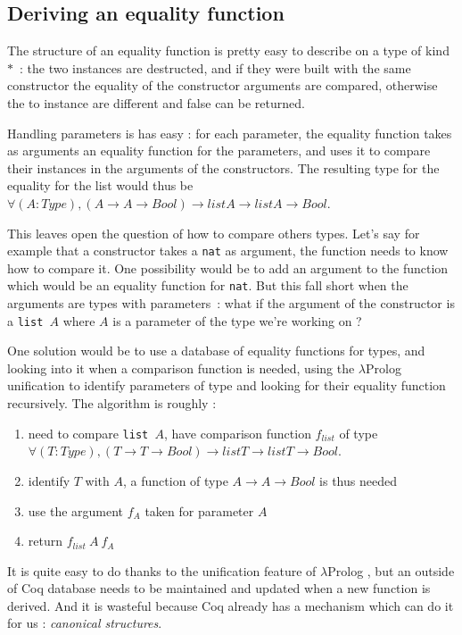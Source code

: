 \documentclass{article}
\newcommand{\lprog}{$\lambda$Prolog }
\begin{document}
\subsection{Deriving an equality function}

The structure of an equality function is pretty easy to describe on a type of
kind $*$~: the two instances are destructed, and if they were built with
the same constructor the equality of the constructor arguments are compared,
otherwise the to instance are different and false can be returned.

Handling parameters is has easy : for each parameter, the equality function
takes as arguments an equality function for the parameters, and uses it to
compare their instances in the arguments of the constructors. The resulting
type for the equality for the list would thus be
$\forall (A : Type), (A \rightarrow A \rightarrow Bool) \rightarrow
list A \rightarrow list A \rightarrow Bool$.

This leaves open the question of how to compare others types. Let's say for
example that a constructor takes a \texttt{nat} as argument, the function needs
to know how to compare it. One possibility would be to add an argument to the
function which would be an equality function for \texttt{nat}. But this fall
short when the arguments are types with parameters~: what if the argument of
the constructor is a \texttt{list $A$} where $A$ is a parameter of the type
we're working on ?

One solution would be to use a database of equality functions for types, and
looking into it when a comparison function is needed, using the \lprog
unification to identify parameters of type and looking for their equality function
recursively. The algorithm is roughly :\begin{enumerate}
    \item need to compare \texttt{list $A$}, have comparison function $f_{list}$ of type
        $\forall (T : Type), (T \rightarrow T \rightarrow Bool) \rightarrow
        list T \rightarrow list T \rightarrow Bool$.
    \item identify $T$ with $A$, a function of type $A \rightarrow A \rightarrow Bool$
        is thus needed
    \item use the argument $f_A$ taken for parameter $A$
    \item return $f_{list}\ A\ f_A$
\end{enumerate}

It is quite easy to do thanks to the unification feature of \lprog,
but an outside of Coq database needs to be maintained and updated when a new
function is derived. And it is wasteful because Coq already has a mechanism
which can do it for us : \emph{canonical structures}.
\end{document}
